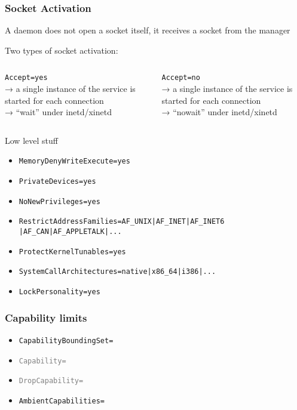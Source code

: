 \documentclass[serif]{beamer}
\begin{document}
\begin{frame}[c]
  \frametitle{Socket Activation}

  A daemon does not open a socket itself, it receives a socket from the manager

  \medskip
  \pause

  \centering
  Two types of socket activation:

  \medskip

  \begin{columns}
    \begin{column}{0.5\textwidth}
      \texttt{Accept=yes}\\
      → a single instance of the service is started for each connection\\
      → ``wait'' under inetd/xinetd
    \end{column}
    \begin{column}{0.5\textwidth}
      \texttt{Accept=no}\\
      → a single instance of the service is started for each connection\\
      → ``nowait'' under inetd/xinetd
    \end{column}
  \end{columns}
\end{frame}

\begin{frame}[c]
  \Huge{Low level stuff}
\end{frame}

\begin{frame}
  \begin{itemize}
  \item \texttt{MemoryDenyWriteExecute=yes}
  \item \texttt{PrivateDevices=yes}
  \item \texttt{NoNewPrivileges=yes}
  \item \texttt{RestrictAddressFamilies=AF\_UNIX|AF\_INET|AF\_INET6
        \color{gray}|AF\_CAN|AF\_APPLETALK|...}
  \item \texttt{ProtectKernelTunables=yes}
  \item \texttt{SystemCallArchitectures=native\color{gray}|x86\_64|i386|...}
  \item \texttt{LockPersonality=yes}
  \end{itemize}
\end{frame}

\begin{frame}
  \frametitle{Capability limits}

  \begin{itemize}
  \item \texttt{CapabilityBoundingSet=}
  \item \texttt{\textcolor{gray}{Capability=}}
  \item \texttt{\textcolor{gray}{DropCapability=}}
  \item \texttt{AmbientCapabilities=}
  \end{itemize}
\end{frame}
\end{document}
